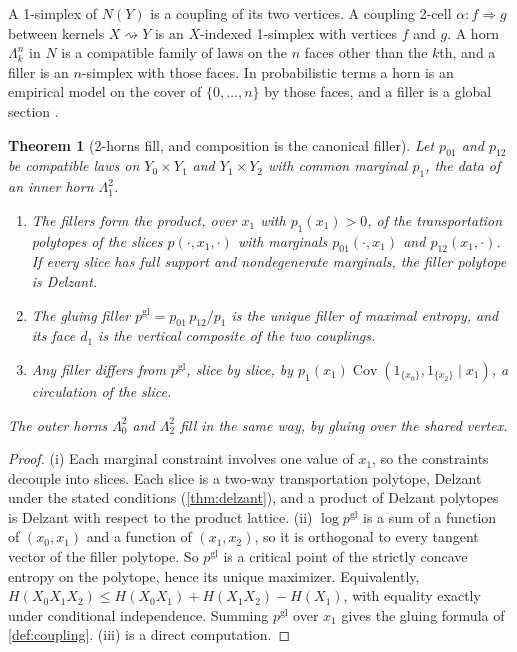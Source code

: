 \documentclass[11pt]{article}
\newtheorem{theorem}{Theorem}[section]
\theoremstyle{definition}
\theoremstyle{remark}
\begin{document}
A 1-simplex of $N(Y)$ is a coupling of its two vertices. A coupling 2-cell $\alpha\colon f\Rightarrow g$ between kernels
$X\rightsquigarrow Y$ is an $X$-indexed 1-simplex with vertices $f$ and $g$. A horn $\Lambda^n_k$ in $N$ is a compatible family of
laws on the $n$ faces other than the $k$th, and a filler is an $n$-simplex with those faces. In probabilistic terms
a horn is an empirical model on the cover of $\{0,\dots,n\}$ by those faces, and a filler is a global section
\cite{AbramskyBrandenburger2011}.

\begin{theorem}[2-horns fill, and composition is the canonical filler]\label{thm:2horn}
Let $p_{01}$ and $p_{12}$ be compatible laws on $Y_0\times Y_1$ and $Y_1\times Y_2$ with common marginal $p_1$, the data of
an inner horn $\Lambda^2_1$.
\begin{enumerate}[label=(\roman*)]
\item The fillers form the product, over $x_1$ with $p_1(x_1)>0$, of the transportation polytopes of the slices
  $p(\cdot,x_1,\cdot)$ with marginals $p_{01}(\cdot,x_1)$ and $p_{12}(x_1,\cdot)$. If every slice has full support and
  nondegenerate marginals, the filler polytope is Delzant.
\item The gluing filler $p^{\mathrm{gl}}=p_{01}\,p_{12}/p_1$ is the unique filler of maximal entropy, and its face $d_1$ is the
  vertical composite of the two couplings.
\item Any filler differs from $p^{\mathrm{gl}}$, slice by slice, by $p_1(x_1)\operatorname{Cov}(1_{\{x_0\}},1_{\{x_2\}}\mid x_1)$, a
  circulation of the slice.
\end{enumerate}
The outer horns $\Lambda^2_0$ and $\Lambda^2_2$ fill in the same way, by gluing over the shared vertex.
\end{theorem}
\begin{proof}
(i) Each marginal constraint involves one value of $x_1$, so the constraints decouple into slices. Each slice is a
two-way transportation polytope, Delzant under the stated conditions (\cref{thm:delzant}), and a product of
Delzant polytopes is Delzant with respect to the product lattice. (ii) $\log p^{\mathrm{gl}}$ is a sum of a function of
$(x_0,x_1)$ and a function of $(x_1,x_2)$, so it is orthogonal to every tangent vector of the filler polytope. So
$p^{\mathrm{gl}}$ is a critical point of the strictly concave entropy on the polytope, hence its unique maximizer.
Equivalently, $H(X_0X_1X_2)\le H(X_0X_1)+H(X_1X_2)-H(X_1)$, with equality exactly under conditional independence.
Summing $p^{\mathrm{gl}}$ over $x_1$ gives the gluing formula of \cref{def:coupling}. (iii) is a direct computation.
\end{proof}
\end{document}
